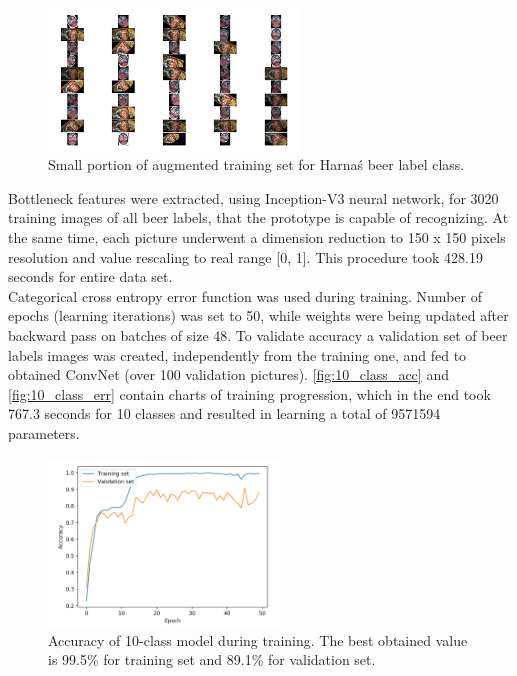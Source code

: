\documentclass[11pt, a4paper]{article}
\begin{document}
\begin{figure}[h]
\includegraphics[width=0.6\textwidth]{augm_subset}
\centering
\caption[Część zbioru zdjęć po augmentacji danych]{Small portion of augmented training set for \foreignlanguage{polish}{Harnaś} beer label class.}
\label{fig:augm_subset}
\end{figure}

Bottleneck features were extracted, using Inception-V3 neural network, for 3020 training images of all beer labels, that the prototype is capable of recognizing. At the same time, each picture underwent a dimension reduction to 150 x 150 pixels resolution and value rescaling to real range [0, 1]. This procedure took 428.19 seconds for entire data set.\\

Categorical cross entropy error function was used during training. Number of epochs (learning iterations) was set to 50, while weights were being updated after backward pass on batches of size 48. To validate accuracy a validation set of beer labels images was created, independently from the training one, and fed to obtained ConvNet (over 100 validation pictures). \autoref{fig:10_class_acc} and \ref{fig:10_class_err} contain charts of training progression, which in the end took 767.3 seconds for 10 classes and resulted in learning a total of 9571594 parameters.

\begin{figure}[h]
\includegraphics[width=0.55\textwidth]{10_class_acc}
\centering
\caption[Dokładność rozpoznawarki 10 różnych etykiet piw]{Accuracy of 10-class model during training. The best obtained value is 99.5\% for training set and 89.1\% for validation set.}
\label{fig:10_class_acc}
\end{figure}
\end{document}
